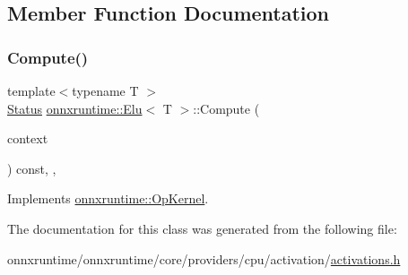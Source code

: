 \subsection{Member Function Documentation}
\mbox{\label{classonnxruntime_1_1Elu_ac3f3a08e65865a0384448edffab016c5}} 
\subsubsection{\texorpdfstring{Compute()}{Compute()}}
{\footnotesize\ttfamily template$<$typename T $>$ \\
\mbox{\hyperlink{classonnxruntime_1_1common_1_1Status}{Status}} \mbox{\hyperlink{classonnxruntime_1_1Elu}{onnxruntime\+::\+Elu}}$<$ T $>$\+::Compute (\begin{DoxyParamCaption}\item[{\mbox{\hyperlink{classonnxruntime_1_1OpKernelContext}{Op\+Kernel\+Context}} $\ast$}]{context }\end{DoxyParamCaption}) const\hspace{0.3cm}{\ttfamily [inline]}, {\ttfamily [override]}, {\ttfamily [virtual]}}



Implements \mbox{\hyperlink{classonnxruntime_1_1OpKernel_a9eca8656a78b1b3ab9d3351a12798650}{onnxruntime\+::\+Op\+Kernel}}.



The documentation for this class was generated from the following file\+:\begin{DoxyCompactItemize}
\item 
onnxruntime/onnxruntime/core/providers/cpu/activation/\mbox{\hyperlink{cpu_2activation_2activations_8h}{activations.\+h}}\end{DoxyCompactItemize}
